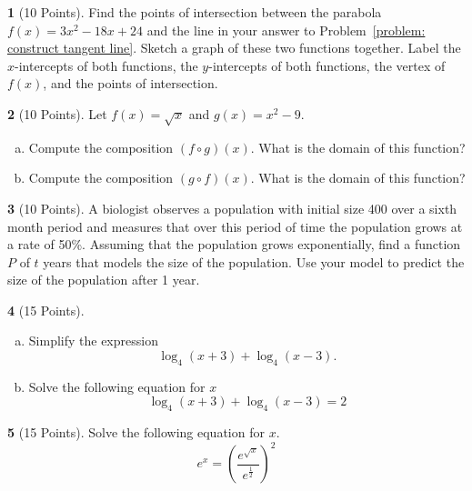 \documentclass[12pt]{amsart}
\theoremstyle{definition}
\newtheorem{thm}{}
\begin{document}
\begin{thm}[10 Points]\label{problem: intersection}
  Find the points of intersection between the parabola $f(x) = 3x^2 - 18x + 24$ and the line in your answer to Problem~\ref{problem: construct tangent line}.
  Sketch a graph of these two functions together.
  Label the $x$-intercepts of both functions, the $y$-intercepts of both functions, the vertex of $f(x)$, and the points of intersection.
\end{thm}

\newpage

\begin{thm}[10 Points]\label{problem: domain}
  Let $f(x) = \sqrt{x}$ and $g(x) = x^2 - 9$.
  \begin{enumerate}[(a)]
  \item
    Compute the composition $(f \circ g)(x)$.
    What is the domain of this function?
    \vspace{2in}
  \item
    Compute the composition $(g \circ f)(x)$.
    What is the domain of this function?
    \vspace{2in}
  \end{enumerate}
\end{thm}

\begin{thm}[10 Points]\label{problem: exponential function}
  A biologist observes a population with initial size 400 over a sixth month period and measures that over this period of time the population grows at a rate of 50\%.
  Assuming that the population grows exponentially, find a function $P$ of $t$ years that models the size of the population.
  Use your model to predict the size of the population after 1 year.
\end{thm}

\newpage

\begin{thm}[15 Points]\label{problem: logarithm equation}
    \begin{enumerate}[(a)]
  \item
    Simplify the expression 
    $$\log_4(x + 3) + \log_4(x - 3).$$
    \vspace{2in}
  \item
    Solve the following equation for $x$
    $$\log_4(x + 3) + \log_4(x - 3) = 2$$
    \vspace{2in}
  \end{enumerate}
\end{thm}

\begin{thm}[15 Points]\label{problem: exponential equation}
  Solve the following equation for $x$.
  $$e^{x} = \left(\frac{e^{\sqrt{x}}}{e^{\frac{1}{2}}}\right)^{2}$$
\end{thm}
\end{document}
